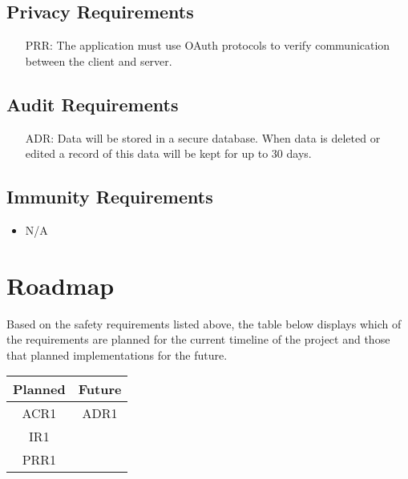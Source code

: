 \documentclass{article}
\newcounter{PRRnum}
\newcounter{ADRnum}
\begin{document}
	\subsection{Privacy Requirements}
	\noindent 
	\begin{itemize}
		\item[PRR\refstepcounter{PRRnum}\thePRRnum:]
		The application must use OAuth protocols to verify communication between the client and server.
	\end{itemize}
	\subsection{Audit Requirements}
	\noindent
	\begin{itemize}
		\item[ADR\refstepcounter{ADRnum}\theADRnum:]
		Data will be stored in a secure database. When data is deleted or edited a record of this data will be kept for up to 30 days.
	\end{itemize}
	\subsection{Immunity Requirements}
	\noindent 
	\begin{itemize}
		\item N/A
	\end{itemize}
	
	
	\section{Roadmap}
	
	
	Based on the safety requirements listed above, the table below displays which of the requirements are planned for the current timeline of the project and those that planned implementations for the future.
	
	\begin{center}
		\begin{tabular}{ |c|c| } 
			\hline
			Planned & Future \\
			\hline 
			\hline
			ACR1 & ADR1 \\ 
			\hline
			IR1 & \\
			\hline 
			PRR1 & \\ 
			\hline
		\end{tabular}
	\end{center}
\end{document}

